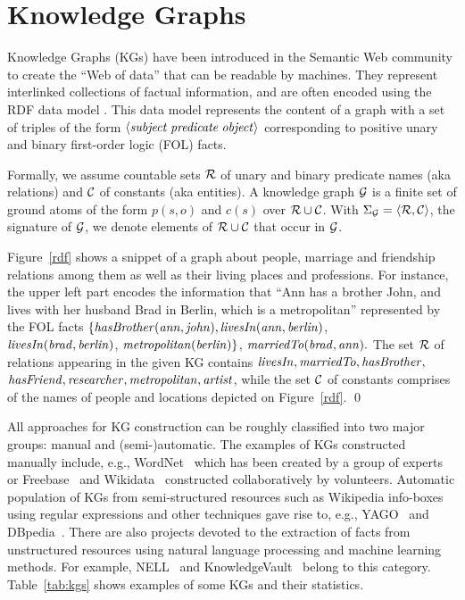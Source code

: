 \section{Knowledge Graphs}
\label{sec:kgs}

Knowledge Graphs (KGs) have been introduced in the Semantic Web community to create the ``Web of data'' that can be readable by machines. They represent interlinked collections of factual information, and are often encoded using the RDF data model \cite{rdf2004}. This data model represents the content of a graph with a set of triples of the form $\langle\mathit{subject\;predicate\;object}\rangle$ corresponding to positive unary and binary first-order logic (FOL) facts.  

Formally, we assume countable sets $\mathcal{R}$ of unary and binary predicate names (aka relations) and $\mathcal{C}$ of constants (aka entities). A knowledge graph $\mathcal{G}$ is a finite set of ground atoms of the form $p(s,o)$ and $c(s)$ over $\mathcal{R} \cup \mathcal{C}$. With $\Sigma_{\mathcal{G}}=\langle\mathcal{R},\mathcal{C}\rangle$, the signature of $\mathcal{G}$, we denote elements of $\mathcal{R} \cup \mathcal{C}$ that occur in $\mathcal{G}$.

\begin{example} Figure~\ref{rdf} shows a snippet of a graph about people, marriage and friendship %
relations among them as well as their living places and professions. For instance, the upper left part encodes the information that ``Ann has a brother John, and lives with her husband Brad in Berlin, which is a metropolitan'' represented by the FOL facts $\mathit{\{hasBrother(ann, john),}$$\mathit{ livesIn(ann, berlin)}$, \\$\mathit{livesIn(brad, berlin)}$, $\mathit{metropolitan(berlin)}\}$, $\mathit{marriedTo(brad, ann)}.$
The set $\mathcal{R}$ of relations appearing in the given KG contains $\mathit{livesIn,marriedTo,hasBrother,}$\\$\mathit{hasFriend,researcher,metropolitan,artist}$, while the set $\mathcal{C}$ of constants comprises of the names of people and locations depicted on Figure~\ref{rdf}. \qed
\end{example}



All approaches for KG construction can be roughly classified into two major groups: manual and (semi-)automatic. The examples of KGs constructed manually include, e.g., WordNet~\cite{wordnet} which has been created by a group of experts or Freebase~\cite{Freebase} and Wikidata~\cite{wikidata} constructed collaboratively by volunteers. 
Automatic population of KGs from semi-structured resources such as Wikipedia info-boxes using regular expressions and other techniques gave rise to, e.g., YAGO~\cite{yago} and DBpedia~\cite{dbpedia}. 
There are also projects 
devoted to the extraction of facts from unstructured resources using natural language processing and machine learning methods.  
For example, NELL~\cite{nell} and KnowledgeVault~\cite{KnowledgeVault} belong to this category. Table~\ref{tab:kgs} shows examples of some KGs and their statistics.

